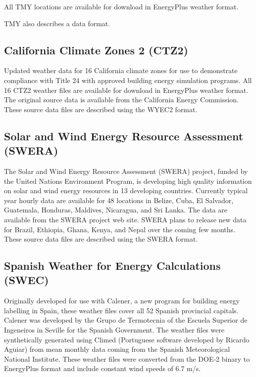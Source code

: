 All TMY locations are available for download in EnergyPlus weather format.

TMY also describes a data format.

\subsection{California Climate Zones 2 (CTZ2)}\label{california-climate-zones-2-ctz2}

Updated weather data for 16 California climate zones for use to demonstrate compliance with Title 24 with approved building energy simulation programs. All 16 CTZ2 weather files are available for download in EnergyPlus weather format. The original source data is available from the California Energy Commission. These source data files are described using the WYEC2 format.

\subsection{Solar and Wind Energy Resource Assessment (SWERA)}\label{solar-and-wind-energy-resource-assessment-swera}

The Solar and Wind Energy Resource Assessment (SWERA) project, funded by the United Nations Environment Program, is developing high quality information on solar and wind energy resources in 13 developing countries. Currently typical year hourly data are available for 48 locations in Belize, Cuba, El Salvador, Guatemala, Honduras, Maldives, Nicaragua, and Sri Lanka. The data are available from the SWERA project web site. SWERA plans to release new data for Brazil, Ethiopia, Ghana, Kenya, and Nepal over the coming few months. These source data files are described using the SWERA format.

\subsection{Spanish Weather for Energy Calculations (SWEC)}\label{spanish-weather-for-energy-calculations-swec}

Originally developed for use with Calener, a new program for building energy labelling in Spain, these weather files cover all 52 Spanish provincial capitals. Calener was developed by the Grupo de Termotecnia of the Escuela Superior de Ingeneiros in Seville for the Spanish Government. The weather files were synthetically generated using Climed (Portuguese software developed by Ricardo Aguiar) from mean monthly data coming from the Spanish Meteorological National Institute. These weather files were converted from the DOE-2 binary to EnergyPlus format and include constant wind speeds of 6.7 m/s.

